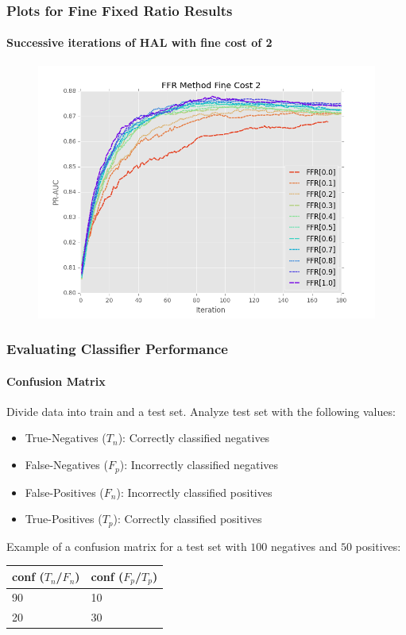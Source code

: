 \documentclass{beamer}
\begin{document}
\begin{frame}[noframenumbering]
    \frametitle{Plots for Fine Fixed Ratio Results}  %
    \framesubtitle{Successive iterations of HAL with fine cost of 2}
    \begin{figure}[!htb]
        \centering
        \includegraphics[width=0.8\columnwidth]{fig/ParamsFFR_PR_Cost2_rnds0_180}
        \label{fig:ParamsFFR_PR_Cost2_rnds0_180}
    \end{figure}
\end{frame}
\begin{frame}[noframenumbering]
    \frametitle{Evaluating Classifier Performance}
    \framesubtitle{Confusion Matrix}     %
\par Divide data into train and a test set. Analyze test set with the following values:
      \begin{itemize}
      \item True-Negatives ($T_n$): Correctly classified negatives
      \item False-Negatives ($F_p$): Incorrectly classified negatives
      \item False-Positives ($F_n$): Incorrectly classified positives
      \item True-Positives ($T_p$): Correctly classified positives
    \end{itemize}
    \par Example of a confusion matrix for a test set with $100$ negatives and $50$ positives:
    \begin{table}[H]
    \centering
    \label{tab:confEx}
    \begin{tabular}{|l||l|}\hline
    conf ($T_n$/$F_n$) & conf ($F_p$/$T_p$) \\ \hline
    90 & 10 \\ \hline
    20 & 30 \\ \hline
    \end{tabular}
    \end{table}
\end{frame}
\end{document}

